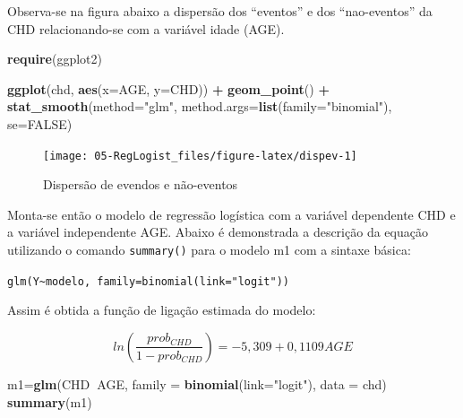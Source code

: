 \documentclass[12pt,brazil,oneside]{book}
\newenvironment{Shaded}{\begin{snugshade}}{\end{snugshade}}
\newcommand{\DataTypeTok}[1]{\textcolor[rgb]{0.13,0.29,0.53}{#1}}
\newcommand{\KeywordTok}[1]{\textcolor[rgb]{0.13,0.29,0.53}{\textbf{#1}}}
\newcommand{\NormalTok}[1]{#1}
\newcommand{\OperatorTok}[1]{\textcolor[rgb]{0.81,0.36,0.00}{\textbf{#1}}}
\newcommand{\OtherTok}[1]{\textcolor[rgb]{0.56,0.35,0.01}{#1}}
\newcommand{\StringTok}[1]{\textcolor[rgb]{0.31,0.60,0.02}{#1}}
\begin{document}
Observa-se na figura abaixo a dispersão dos ``eventos'' e dos
``nao-eventos'' da CHD relacionando-se com a variável idade (AGE).

\begin{Shaded}
\begin{Highlighting}[]
\KeywordTok{require}\NormalTok{(ggplot2)}

\KeywordTok{ggplot}\NormalTok{(chd, }\KeywordTok{aes}\NormalTok{(}\DataTypeTok{x=}\NormalTok{AGE, }\DataTypeTok{y=}\NormalTok{CHD)) }\OperatorTok{+}\StringTok{ }
\StringTok{  }\KeywordTok{geom_point}\NormalTok{() }\OperatorTok{+}\StringTok{ }
\StringTok{  }\KeywordTok{stat_smooth}\NormalTok{(}\DataTypeTok{method=}\StringTok{"glm"}\NormalTok{, }\DataTypeTok{method.args=}\KeywordTok{list}\NormalTok{(}\DataTypeTok{family=}\StringTok{"binomial"}\NormalTok{), }\DataTypeTok{se=}\OtherTok{FALSE}\NormalTok{)}
\end{Highlighting}
\end{Shaded}

\begin{figure}[h]

{\centering \texttt{[image: 05-RegLogist\_files/figure-latex/dispev-1]} 

}

\caption{Dispersão de evendos e não-eventos}\label{fig:dispev}
\end{figure}

Monta-se então o modelo de regressão logística com a variável dependente
CHD e a variável independente AGE. Abaixo é demonstrada a descrição da
equação utilizando o comando \texttt{summary()} para o modelo m1 com a
sintaxe básica:

\texttt{glm(Y\textasciitilde{}modelo,\ family=binomial(link="logit"))}

Assim é obtida a função de ligação estimada do modelo:

\[
ln\left (\frac{prob_{CHD}}{1-prob_{CHD}}  \right ) = - 5,309 + 0,1109AGE
\]

\begin{Shaded}
\begin{Highlighting}[]
\NormalTok{m1=}\KeywordTok{glm}\NormalTok{(CHD}\OperatorTok{~}\NormalTok{AGE, }\DataTypeTok{family =} \KeywordTok{binomial}\NormalTok{(}\DataTypeTok{link=}\StringTok{"logit"}\NormalTok{), }\DataTypeTok{data =}\NormalTok{ chd)}
\KeywordTok{summary}\NormalTok{(m1)}
\end{Highlighting}
\end{Shaded}
\end{document}
